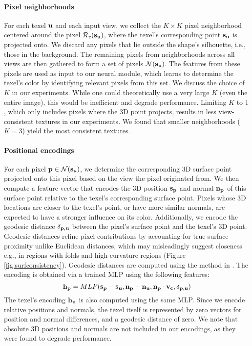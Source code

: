 \paragraph{Pixel neighborhoods}
For each texel $\mathbf{u}$ and each input view, we collect the $K \times K$ pixel neighborhood
centered around the pixel $\mathcal{R}_{c}( \mathbf{s}_{\mathbf{u}} )$, where the texel's corresponding point $\mathbf{s}_{\mathbf{u}}$ is projected onto. 
We discard any pixels that lie outside the shape's silhouette, i.e., those in the background. 
The remaining pixels from neighborhoods across all views are then gathered to form a set of pixels
$\mathcal{N}(\mathbf{s}_{\mathbf{u}})$.
The features from these pixels are used as input to our neural module, which learns to determine the texel's color by identifying relevant pixels from this set.
We discuss the choice of $K$ in our experiments.
 While one could theoretically use a very large $K$ (even the entire image), this would be inefficient and degrade performance. 
 Limiting $K$ to $1$, which only includes pixels where the 3D point projects, results in less view-consistent textures in our experiments. 
  We found that smaller neighborhoods ($K=3$) yield the most consistent textures.
 
\paragraph{Positional encodings}
For each pixel $\mathbf{p} \in \mathcal{N}(\mathbf{s}_u)$, we determine the corresponding 3D surface point projected onto this pixel based on the view the pixel originated from. 
We then compute a feature vector that encodes the 3D position $\mathbf{s}_{\mathbf{p}}$ and normal $\mathbf{n}_{\mathbf{p}}$ of this surface point relative to the texel's corresponding surface point.
Pixels whose 3D locations are closer to the texel's point, or have more similar normals, are expected to have a stronger influence on its color.
Additionally, we encode the geodesic distance $\delta_{\mathbf{p}, \mathbf{u}}$ between the pixel's surface point and the texel's 3D point.
Geodesic distances refine pixel contributions by accounting for true surface proximity unlike Euclidean distances, which may misleadingly suggest closeness e.g., in regions with folds and high-curvature regions (Figure \ref{fig:surfconsistency}). Geodesic distances are computed using the method in \cite{Melvaer:2012:GPC}. The encoding is obtained via a trained MLP using the following features:
\begin{equation}
\mathbf{h}_{\mathbf{p}} = MLP( \mathbf{s}_{\mathbf{p}} - \mathbf{s}_{\mathbf{u}}, \mathbf{n}_{\mathbf{p}} - \mathbf{n}_{\mathbf{u}}, \mathbf{n}_{\mathbf{p}} \cdot \mathbf{v}_{\mathbf{c}}, \delta_{\mathbf{p}, \mathbf{u}} )
\label{eq:positional_encodings}
\end{equation}
The texel's encoding  $\mathbf{h}_{\mathbf{u}}$ is also computed using the same MLP. Since we encode relative positions and normals, the texel itself is represented by zero vectors for position and normal differences, and a geodesic distance of zero. We note that absolute 3D positions and normals are not included in our encodings, as they were found to degrade performance.

